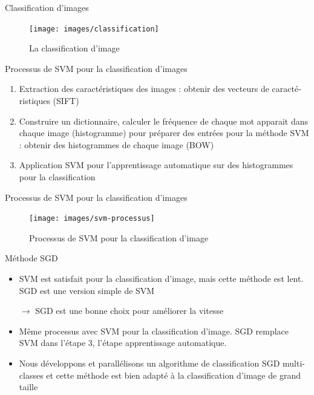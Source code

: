 \documentclass[11pt]{beamer}
\begin{document}
\begin{otherlanguage}{french}
\begin{frame}{Classification d'images}
\begin{figure}[ht!]
\centering
\texttt{[image: images/classification]}
\caption{La classification d'image}
\vspace{-2.0em}
\label{fig:classification}
\end{figure}
\end{frame}

\begin{frame}{Processus de SVM pour la classification d'images}
\begin{enumerate}
\item Extraction des caractéristiques des images : obtenir des vecteurs de caractéristiques (SIFT)
\item Construire un dictionnaire, calculer le fréquence de chaque mot apparait dans chaque image (histogramme) pour préparer des entrées pour la méthode SVM : obtenir des histogrammes de chaque image (BOW)
\item Application SVM pour l'apprentissage automatique sur des histogrammes pour la classification
\end{enumerate}
\end{frame}


\begin{frame}{Processus de SVM pour la classification d'images}
\begin{figure}[ht!]
\centering
\texttt{[image: images/svm-processus]}
\caption{Processus de SVM pour la classification d'image}
\vspace{-2.0em}
\label{overflow}
\end{figure}
\end{frame}

\begin{frame}{Méthode SGD}
\begin{itemize}
\item SVM est satisfait pour la classification d'image, mais cette méthode est lent. SGD est une version simple de SVM

$\rightarrow$ SGD est une bonne choix pour améliorer la vitesse
\item Même processus avec SVM pour la classification d'image. SGD remplace SVM dans l'étape 3, l'étape apprentissage automatique.
\item Nous développons et parallélisons un algorithme de classification SGD multi-classes et cette méthode est bien adapté à la classification d'image de grand taille
\end{itemize}
\end{frame}



\end{otherlanguage}
\end{document}
